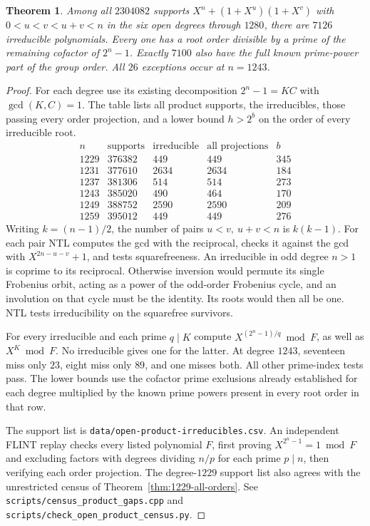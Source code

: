 \documentclass[11pt]{article}
\newtheorem{theorem}{Theorem}
\begin{document}
\begin{theorem}\label{thm:open-product-orders}
Among all \(2304082\) supports \(X^n+(1+X^u)(1+X^v)\) with
\(0<u<v<u+v<n\) in the six open degrees through \(1280\),
there are \(7126\) irreducible polynomials. Every one has a root
order divisible by a prime of the remaining cofactor of \(2^n-1\).
Exactly \(7100\) also have the full known prime-power part of the group
order. All \(26\) exceptions occur at \(n=1243\).
\end{theorem}
\begin{proof}
For each degree use its existing decomposition \(2^n-1=KC\) with
\(\gcd(K,C)=1\). The table lists all product supports, the irreducibles,
those passing every order projection, and a lower bound \(h>2^b\)
on the order of every irreducible root.
\[
\begin{array}{r|r|r|r|r}
n&\text{supports}&\text{irreducible}&\text{all projections}&b\\\hline
1229&376382&449&449&345\\
1231&377610&2634&2634&184\\
1237&381306&514&514&273\\
1243&385020&490&464&170\\
1249&388752&2590&2590&209\\
1259&395012&449&449&276
\end{array}
\]
Writing \(k=(n-1)/2\), the number of pairs \(u<v,\ u+v<n\)
is \(k(k-1)\). For each pair NTL computes the gcd with the reciprocal,
checks it against the gcd with \(X^{2n-u-v}+1\), and tests
squarefreeness. An irreducible in odd degree \(n>1\) is coprime to
its reciprocal. Otherwise inversion would permute its single
Frobenius orbit, acting as a power of the odd-order Frobenius cycle,
and an involution on that cycle must be the identity. Its roots would
then all be one. NTL tests irreducibility on the squarefree survivors.

For every irreducible and each prime \(q\mid K\) compute
\(X^{(2^n-1)/q}\bmod F\), as well as \(X^K\bmod F\).
No irreducible gives one for the latter. At degree \(1243\), seventeen
miss only \(23\), eight miss only \(89\), and one misses both.
All other prime-index tests pass. The lower bounds use the cofactor
prime exclusions already established for each degree multiplied
by the known prime powers present in every root order in that row.

The support list is \nolinkurl{data/open-product-irreducibles.csv}.
An independent FLINT replay checks every listed polynomial \(F\),
first proving \(X^{2^n-1}=1\bmod F\) and excluding factors with
degrees dividing \(n/p\) for each prime \(p\mid n\), then verifying
each order projection. The degree-\(1229\) support list also agrees
with the unrestricted census of Theorem~\ref{thm:1229-all-orders}.
See \nolinkurl{scripts/census_product_gaps.cpp} and
\nolinkurl{scripts/check_open_product_census.py}.
\end{proof}
\end{document}
